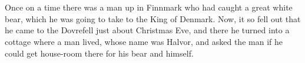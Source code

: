 \chapter*{\englishabstractname}
%
Once on a time there was a man up in Finnmark who had caught a great white bear, which he was going to take to the King of Denmark. Now, it so fell out that he came to the Dovrefell just about Christmas Eve, and there he turned into a cottage where a man lived, whose name was Halvor, and asked the man if he could get house-room there for his bear and himself.
%
\clearpage
